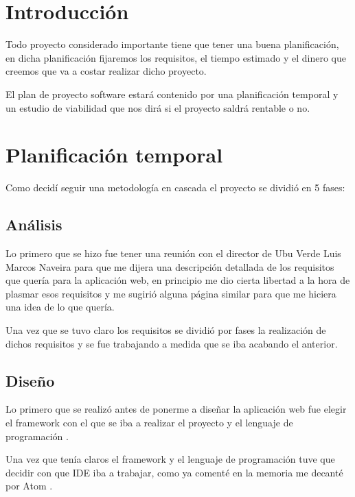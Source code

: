 
\section{Introducción}

Todo proyecto considerado importante tiene que tener una buena planificación, en dicha planificación fijaremos los requisitos, el tiempo estimado y el dinero que creemos que va a costar realizar dicho proyecto.

El plan de proyecto software estará contenido por una planificación temporal y un estudio de viabilidad que nos dirá si el proyecto saldrá rentable o no.

\section{Planificación temporal}

Como decidí seguir una metodología en cascada \cite{ModeloenCascada} el proyecto se dividió en 5 fases: 


\subsection{Análisis}

Lo primero que se hizo fue tener una reunión con el director de Ubu Verde Luis Marcos Naveira para que me dijera una descripción detallada de los requisitos que quería para la aplicación web, en principio me dio cierta libertad a la hora de plasmar esos requisitos y me sugirió alguna página similar para que me hiciera una idea de lo que quería.

Una vez que se tuvo claro los requisitos se dividió por fases la realización de dichos requisitos y se fue trabajando a medida que se iba acabando el anterior.

\subsection{Diseño}

Lo primero que se realizó antes de ponerme a diseñar la aplicación web fue elegir el framework \cite{Django} con el que se iba a realizar el proyecto y el lenguaje de programación \cite{Python}.

Una vez que tenía claros el framework y el lenguaje de programación tuve que decidir con que IDE iba a trabajar, como ya comenté en la memoria me decanté por Atom \cite{Atom}.

